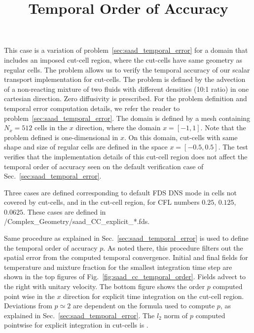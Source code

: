 \documentclass[11pt]{book}
\begin{document}
\label{sec:saad_cc_temporal_error}

This case is a variation of problem~\ref{sec:saad_temporal_error} for a domain that includes an imposed cut-cell region, where the cut-cells have same geometry as regular cells. The problem allows us to verify the temporal accuracy of our scalar transport implementation for cut-cells. The problem is defined by the advection of a non-reacting mixture of two fluids with different densities (10:1 ratio) in one cartesian direction. Zero diffusivity is prescribed. For the problem definition and temporal error computation details, we refer the reader to problem~\ref{sec:saad_temporal_error}.
The domain is defined by a mesh containing $N_x=512$ cells in the $x$ direction, where the domain $x=[-1,1]$. Note that the problem defined is one-dimensional in $x$.
On this domain, cut-cells with same shape and size of regular cells are defined in the space $x=[-0.5,0.5]$. The test verifies that the implementation details of this cut-cell region does not affect the temporal order of accuracy seen on the default verification case of Sec.~\ref{sec:saad_temporal_error}.

\title{Temporal Order of Accuracy}

Three cases are defined corresponding to default FDS DNS mode in cells not covered by cut-cells, and in the cut-cell region, for CFL numbers $0.25$, $0.125$, $0.0625$. These cases are defined in \\ {\ct /Complex\_Geometry/saad\_CC\_explicit\_*.fds}.

Same procedure as explained in Sec.~\ref{sec:saad_temporal_error} is used to define the temporal order of accuracy $p$. As noted there, this procedure filters out the spatial error from the computed temporal convergence. Initial and final fields for temperature and mixture fraction for the smallest integration time step are shown in the top figures of Fig.~\ref{fig:saad_cc_temporal_order}. Fields advect to the right with unitary velocity. The bottom figure shows the order $p$ computed point wise in the $x$ direction for explicit time integration on the cut-cell region. Deviations from $p \simeq 2$ are dependent on the formula used to compute $p$, as explained in Sec.~\ref{sec:saad_temporal_error}.
The $l_2$ norm of $p$ computed pointwise for explicit integration in cut-cells is \!.
\end{document}
